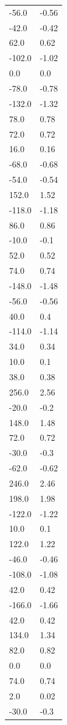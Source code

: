\begin{longtable}{ll}
-56.0 & -0.56 \\
-42.0 & -0.42 \\
62.0 & 0.62 \\
-102.0 & -1.02 \\
0.0 & 0.0 \\
-78.0 & -0.78 \\
-132.0 & -1.32 \\
78.0 & 0.78 \\
72.0 & 0.72 \\
16.0 & 0.16 \\
-68.0 & -0.68 \\
-54.0 & -0.54 \\
152.0 & 1.52 \\
-118.0 & -1.18 \\
86.0 & 0.86 \\
-10.0 & -0.1 \\
52.0 & 0.52 \\
74.0 & 0.74 \\
-148.0 & -1.48 \\
-56.0 & -0.56 \\
40.0 & 0.4 \\
-114.0 & -1.14 \\
34.0 & 0.34 \\
10.0 & 0.1 \\
38.0 & 0.38 \\
256.0 & 2.56 \\
-20.0 & -0.2 \\
148.0 & 1.48 \\
72.0 & 0.72 \\
-30.0 & -0.3 \\
-62.0 & -0.62 \\
246.0 & 2.46 \\
198.0 & 1.98 \\
-122.0 & -1.22 \\
10.0 & 0.1 \\
122.0 & 1.22 \\
-46.0 & -0.46 \\
-108.0 & -1.08 \\
42.0 & 0.42 \\
-166.0 & -1.66 \\
42.0 & 0.42 \\
134.0 & 1.34 \\
82.0 & 0.82 \\
0.0 & 0.0 \\
74.0 & 0.74 \\
2.0 & 0.02 \\
-30.0 & -0.3 \\

\end{longtable}
